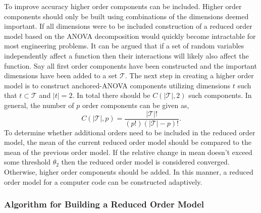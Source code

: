 To improve accuracy higher order components can be included. Higher order components should only be built using combinations of the dimensions deemed important. If all dimensions were to be included construction of a reduced order model based on the \ac{ANOVA} decomposition would quickly become intractable for most engineering problems. It can be argued that if a set of random variables independently affect a function then their interactions will likely also affect the function. Say all first order components have been constructed and the important dimensions have been added to a set $\mathcal{T}$. The next step in creating a higher order model is to construct anchored-\ac{ANOVA} components utilizing dimensions $t$ such that $t\subset\mathcal{T}$ and $\vert t\vert=2$. In total there should be $C(\vert\mathcal{T}\vert,2)$ such components. In general, the number of $p$ order components can be given as,
\begin{equation} \label{eq:num_components_rom_order_p}
   C(\vert\mathcal{T}\vert,p) = \frac{\vert\mathcal{T}\vert!}{
    (p!)(\vert\mathcal{T}\vert-p)!}.
\end{equation}
To determine whether additional orders need to be included in the reduced order model, the mean of the current reduced order model should be compared to the mean of the previous order model. If the relative change in mean doesn't exceed some threshold $\theta_2$ then the reduced order model is considered converged. Otherwise, higher order components should be added. In this manner, a reduced order model for a computer code can be constructed adaptively.    

\subsubsection{Algorithm for Building a Reduced Order Model} \label{subsubsec:full_algorithm}

